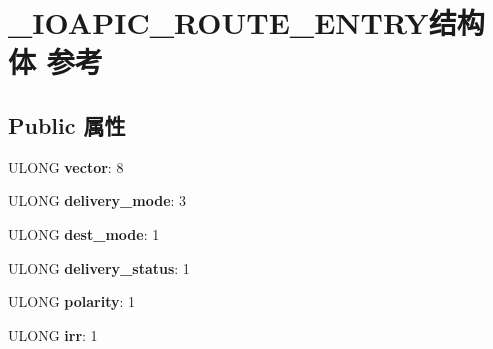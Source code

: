 \hypertarget{struct___i_o_a_p_i_c___r_o_u_t_e___e_n_t_r_y}{}\section{\+\_\+\+I\+O\+A\+P\+I\+C\+\_\+\+R\+O\+U\+T\+E\+\_\+\+E\+N\+T\+R\+Y结构体 参考}
\label{struct___i_o_a_p_i_c___r_o_u_t_e___e_n_t_r_y}
\subsection*{Public 属性}
\begin{DoxyCompactItemize}
\item 
\mbox{\label{struct___i_o_a_p_i_c___r_o_u_t_e___e_n_t_r_y_a77438e078acf7905d5490087685af26c}} 
U\+L\+O\+NG {\bfseries vector}\+: 8
\item 
\mbox{\label{struct___i_o_a_p_i_c___r_o_u_t_e___e_n_t_r_y_a2d3ad8bb0175eab9c7dc3dc6c5be977c}} 
U\+L\+O\+NG {\bfseries delivery\+\_\+mode}\+: 3
\item 
\mbox{\label{struct___i_o_a_p_i_c___r_o_u_t_e___e_n_t_r_y_a92d87b46f301ac1c186ca3eed31cfa8d}} 
U\+L\+O\+NG {\bfseries dest\+\_\+mode}\+: 1
\item 
\mbox{\label{struct___i_o_a_p_i_c___r_o_u_t_e___e_n_t_r_y_a5f1dbae21a57f2098ce200c6eb56b90d}} 
U\+L\+O\+NG {\bfseries delivery\+\_\+status}\+: 1
\item 
\mbox{\label{struct___i_o_a_p_i_c___r_o_u_t_e___e_n_t_r_y_a6ebc3ccae8b7b1f35dcc241960060602}} 
U\+L\+O\+NG {\bfseries polarity}\+: 1
\item 
\mbox{\label{struct___i_o_a_p_i_c___r_o_u_t_e___e_n_t_r_y_a2a18c5cba5f964f1f0a58f89a27508f4}} 
U\+L\+O\+NG {\bfseries irr}\+: 1
\item 
\mbox{\label{struct___i_o_a_p_i_c___r_o_u_t_e___e_n_t_r_y_a8cd3e7a0894db4c7643e1883dbd4e0a2}} 

\end{DoxyCompactItemize}
